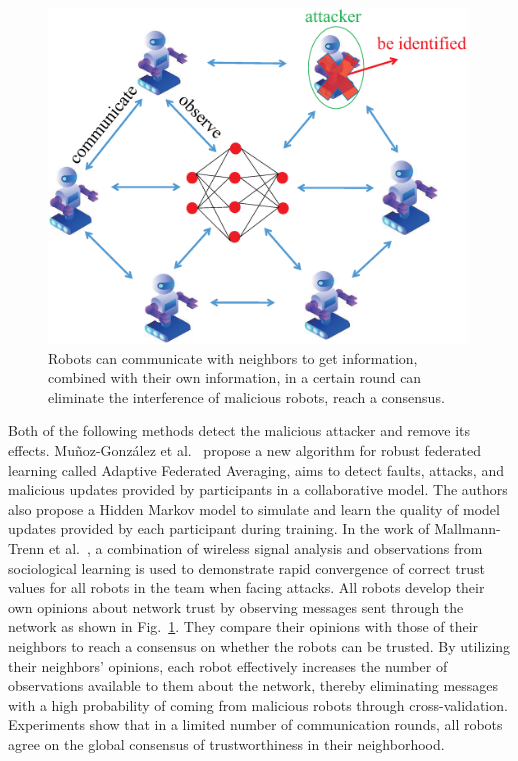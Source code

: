 \documentclass[pdflatex,sn-mathphys-num]{sn-jnl}%
\theoremstyle{thmstyleone}%
\theoremstyle{thmstyletwo}%
\theoremstyle{thmstylethree}%
\begin{document}
\begin{figure}[h]
	\centering
	\includegraphics[width=1.0\linewidth,height=3.5in]{output/fig17.eps}
	\caption{Robots can communicate with neighbors to get information,
		combined with their own information, in a certain round can
		eliminate the interference of malicious robots, reach a consensus.}
	\label{fig17}
\end{figure}


Both of the following methods detect the malicious
attacker and remove its effects. Muñoz-González et al.~\cite{munoz2019byzantine}
propose a new algorithm for robust federated learning
called Adaptive Federated Averaging, aims to detect
faults, attacks, and malicious updates provided by
participants in a collaborative model. The authors also propose
a Hidden Markov model to simulate and learn the quality
of model updates provided by each participant during
training. In the work of Mallmann-Trenn et al.~\cite{mallmann2021crowd}, a
combination of wireless signal analysis and observations
from sociological learning is used to demonstrate rapid
convergence of correct trust values for all robots in the
team when facing attacks. All robots develop their own
opinions about network trust by observing messages sent
through the network as shown in Fig.~\ref{fig17}. They compare
their opinions with those of their neighbors to reach
a consensus on whether the robots can be trusted. By
utilizing their neighbors' opinions, each robot effectively
increases the number of observations available to them
about the network, thereby eliminating messages with a
high probability of coming from malicious robots through
cross-validation. Experiments show that in a limited
number of communication rounds, all robots agree on the
global consensus of trustworthiness in their neighborhood.
\end{document}
